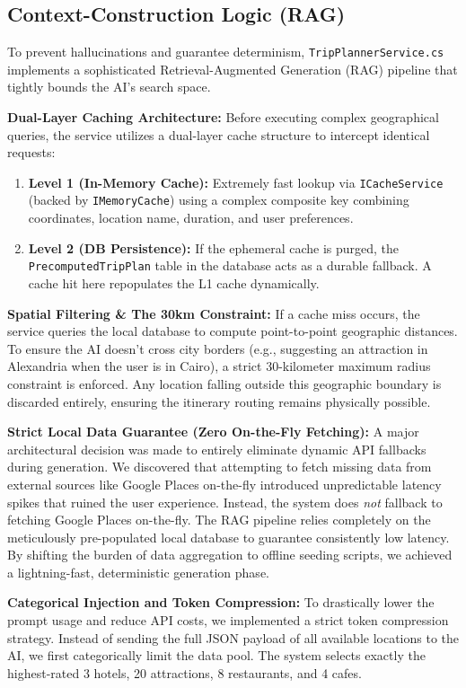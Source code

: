 \subsection{Context-Construction Logic (RAG)}
To prevent hallucinations and guarantee determinism, \texttt{TripPlannerService.cs} implements a sophisticated Retrieval-Augmented Generation (RAG) \cite{rag_lewis} pipeline that tightly bounds the AI's search space.

\textbf{Dual-Layer Caching Architecture:}
Before executing complex geographical queries, the service utilizes a dual-layer cache structure to intercept identical requests:
\begin{enumerate}
    \item \textbf{Level 1 (In-Memory Cache):} Extremely fast lookup via \texttt{ICacheService} (backed by \texttt{IMemoryCache}) using a complex composite key combining coordinates, location name, duration, and user preferences.
    \item \textbf{Level 2 (DB Persistence):} If the ephemeral cache is purged, the \texttt{PrecomputedTripPlan} table in the database acts as a durable fallback. A cache hit here repopulates the L1 cache dynamically.
\end{enumerate}

\textbf{Spatial Filtering \& The 30km Constraint:}
If a cache miss occurs, the service queries the local database to compute point-to-point geographic distances. To ensure the AI doesn't cross city borders (e.g., suggesting an attraction in Alexandria when the user is in Cairo), a strict 30-kilometer maximum radius constraint is enforced. Any location falling outside this geographic boundary is discarded entirely, ensuring the itinerary routing remains physically possible.

\textbf{Strict Local Data Guarantee (Zero On-the-Fly Fetching):}
A major architectural decision was made to entirely eliminate dynamic API fallbacks during generation. We discovered that attempting to fetch missing data from external sources like Google Places on-the-fly introduced unpredictable latency spikes that ruined the user experience. Instead, the system does \textit{not} fallback to fetching Google Places on-the-fly. The RAG pipeline relies completely on the meticulously pre-populated local database to guarantee consistently low latency. By shifting the burden of data aggregation to offline seeding scripts, we achieved a lightning-fast, deterministic generation phase.

\textbf{Categorical Injection and Token Compression:}
To drastically lower the prompt usage and reduce API costs, we implemented a strict token compression strategy. Instead of sending the full JSON payload of all available locations to the AI, we first categorically limit the data pool. The system selects exactly the highest-rated 3 hotels, 20 attractions, 8 restaurants, and 4 cafes. 

